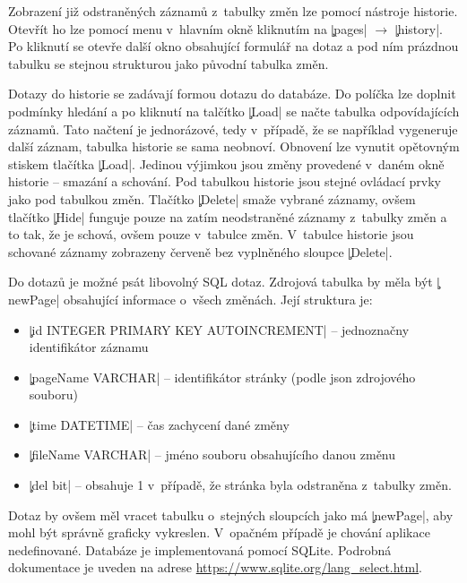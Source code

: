 Zobrazení již odstraněných záznamů z~tabulky změn lze pomocí nástroje historie.
Otevřít ho lze pomocí menu v~hlavním okně kliknutím na \c|pages| $\rightarrow$ \c|history|.
Po kliknutí se otevře další okno obsahující formulář na dotaz a pod ním prázdnou tabulku se stejnou strukturou jako původní tabulka změn.

Dotazy do historie se zadávají formou dotazu do databáze. 
Do políčka lze doplnit podmínky hledání a po kliknutí na talčítko \c|Load| se načte tabulka odpovídajících záznamů. 
Tato načtení je jednorázové, tedy v~případě, že se například vygeneruje další záznam, tabulka historie se sama neobnoví.
Obnovení lze vynutit opětovným stiskem tlačítka \c|Load|.
Jedinou výjimkou jsou změny provedené v~daném okně historie -- smazání a schování.
Pod tabulkou historie jsou stejné ovládací prvky jako pod tabulkou změn.
Tlačítko \c|Delete| smaže vybrané záznamy, ovšem tlačítko \c|Hide| funguje pouze na zatím neodstraněné záznamy z~tabulky změn a to tak, že je schová, ovšem pouze v~tabulce změn.
V~tabulce historie jsou schované záznamy zobrazeny červeně bez vyplněného sloupce \c|Delete|.

Do dotazů je možné psát libovolný SQL dotaz.
Zdrojová tabulka by měla být \c|newPage| obsahující informace o~všech změnách. Její struktura je:
\begin{itemize}
	\item \c|id INTEGER PRIMARY KEY AUTOINCREMENT| -- jednoznačny identifikátor záznamu
	\item \c|pageName VARCHAR| -- identifikátor stránky (podle json zdrojového souboru)
	\item \c|time DATETIME| -- čas zachycení dané změny
	\item \c|fileName VARCHAR| -- jméno souboru obsahujícího danou změnu
	\item \c|del bit| -- obsahuje 1 v~případě, že stránka byla odstraněna z~tabulky změn.
\end{itemize}
Dotaz by ovšem měl vracet tabulku o~stejných sloupcích jako má \c|newPage|, aby mohl být správně graficky vykreslen.
V~opačném případě je chování aplikace nedefinované.
Databáze je implementovaná pomocí SQLite.
Podrobná dokumentace je uveden na adrese \url{https://www.sqlite.org/lang_select.html}.
